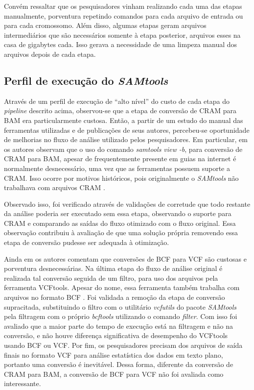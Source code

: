 \documentclass[cic,tc]{iiufrgs}
\begin{document}
Convém ressaltar que os pesquisadores vinham realizando cada uma das etapas
manualmente, porventura repetindo comandos para cada arquivo de entrada ou para
cada cromossomo. Além disso, algumas etapas geram arquivos intermediários que
são necessários somente à etapa posterior, arquivos esses na casa de gigabytes
cada. Isso gerava a necessidade de uma limpeza manual dos arquivos depois de
cada etapa.

\subsection{Perfil de execução do \textit{SAMtools}}

Através de um perfil de execução de ``alto nível'' do custo de cada etapa do
\textit{pipeline} descrito acima, observou-se que a etapa de conversão de CRAM
para BAM era particularmente custosa. Então, a partir de um estudo do manual
das ferramentas utilizadas e de publicações de seus autores, percebeu-se
oportunidade de melhorias no fluxo de análise utilizado pelos pesquisadores. Em
particular, em \cite{danecek2021twelve} os autores observam que o uso do
comando \textit{samtools view -b}, para conversão de CRAM para BAM, apesar de
frequentemente presente em guias na internet é normalmente desnecessário, uma
vez que as ferramentas possuem suporte a CRAM. Isso ocorre por motivos
históricos, pois originalmente o \textit{SAMtools} não trabalhava com arquivos
CRAM \cite{danecek2021twelve}.

Observado isso, foi verificado através de validações de corretude que todo
restante da análise poderia ser executado sem essa etapa, observando o suporte
para CRAM e comparando as saídas do fluxo otimizado com o fluxo original. Essa
observação contribuiu à avaliação de que uma solução própria removendo essa
etapa de conversão pudesse ser adequada à otimização.

Ainda em \cite{danecek2021twelve} os autores comentam que conversões de BCF
para VCF são custosas e porventura desnecessárias. Na última etapa do fluxo de
análise original é realizada tal conversão seguida de um filtro, para uso dos
arquivos pela ferramenta VCFtools. Apesar do nome, essa ferramenta também
trabalha com arquivos no formato BCF \cite{man2015vcftools}. Foi validada a
remoção da etapa de conversão supracitada, substituindo o filtro com o
utilitário \textit{vcfutils} do pacote \textit{SAMtools} pela filtragem com o próprio
\textit{bcftools} utilizando o comando \textit{filter}. Com isso foi avaliado que a
maior parte do tempo de execução está na filtragem e não na conversão, e não
houve diferença significativa de desempenho do VCFtools usando BCF ou VCF. Por
fim, os pesquisadores precisam dos arquivos de saída finais no formato VCF para
análise estatística dos dados em texto plano, portanto uma conversão é
inevitável. Dessa forma, diferente da conversão de CRAM para BAM, a conversão
de BCF para VCF não foi avaliada como interessante.
\end{document}
